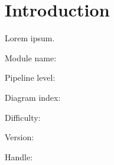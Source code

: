 \documentclass[MS]{spherex}
\begin{document}
\maketitle

\begin{dochistory}
\end{dochistory}

\section{Introduction}

Lorem ipsum. \cite{SPHEREx_SPIE}

Module name: \themodulename

Pipeline level: \thepipelevel

Diagram index: \thediagramindex

Difficulty: \thedifficulty

Version: \theversion

Handle: \thehandle


\end{document}
